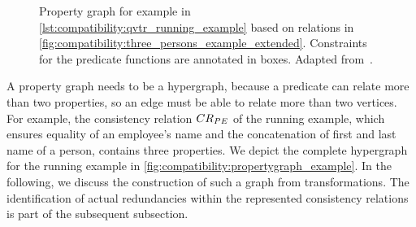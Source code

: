 \begin{figure}
    \centering
    
    
    \caption[Property graph for the running example]{Property graph for \qvtr example in \autoref{lst:compatibility:qvtr_running_example} based on relations in \autoref{fig:compatibility:three_persons_example_extended}. Constraints for the predicate functions are annotated in boxes. Adapted from~.}
    \label{fig:compatibility:propertygraph_example}
\end{figure}

A property graph needs to be a hypergraph, because a predicate can relate more than two properties, so an edge must be able to relate more than two vertices.
For example, the consistency relation $\consistencyrelation{CR}{PE}$ of the running example, which ensures equality of an employee's name and the concatenation of first and last name of a person, contains three properties.
We depict the complete hypergraph for the running example in \autoref{fig:compatibility:propertygraph_example}.
In the following, we discuss the construction of such a graph from \qvtr transformations.
The identification of actual redundancies within the represented consistency relations is part of the subsequent subsection.


